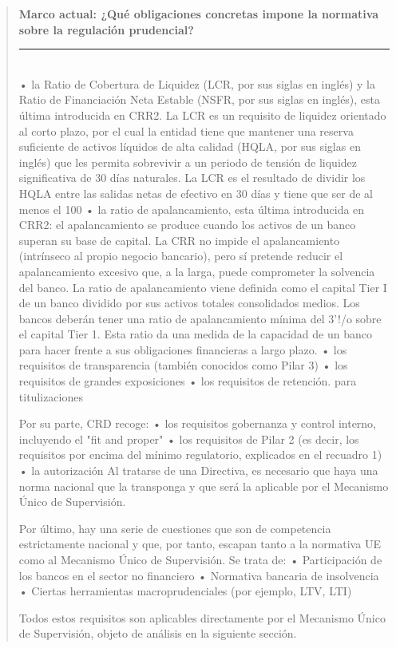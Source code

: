 \documentclass[10pt,a4paper]{article}
\newenvironment{specialblock}[1]{%
      \begin{quote} %
      \small %
      \noindent\textbf{#1}\\[-0.3em] %
      \rule{\linewidth}{0.4pt}\\[0.6em]}{
      \end{quote}}
\begin{document}
\begin{specialblock}{Marco actual: ¿Qué obligaciones concretas impone la normativa sobre la regulación prudencial?}
    • la Ratio de Cobertura de Liquidez (LCR, por sus siglas en inglés) y la Ratio de Financiación Neta Estable (NSFR, por sus siglas en inglés), esta última introducida en CRR2. La LCR es un requisito de liquidez orientado al corto plazo, por el cual la entidad tiene que mantener una reserva suficiente de activos líquidos de alta calidad (HQLA, por sus siglas en inglés) que les permita sobrevivir a un periodo de tensión de liquidez significativa de 30 días naturales. La LCR es el resultado de dividir los HQLA entre las salidas netas de efectivo en 30 días y tiene que ser de al menos el 100%
    • la ratio de apalancamiento, esta última introducida en CRR2: el apalancamiento se produce cuando los activos de un banco superan su base de capital. La CRR no impide el apalancamiento (intrínseco al propio negocio bancario), pero sí pretende reducir el apalancamiento excesivo que, a la larga, puede comprometer la solvencia del banco. La ratio de apalancamiento viene definida como el capital Tier I de un banco dividido por sus activos totales consolidados medios. Los bancos deberán tener una ratio de apalancamiento mínima del 3'!/o sobre el capital Tier 1. Esta ratio da una medida de la capacidad de un banco para hacer frente a sus obligaciones financieras a largo plazo.
    • los requisitos de transparencia (también conocidos como Pilar 3)
    • los requisitos de grandes exposiciones 
    • los requisitos de retención. para titulizaciones

    Por su parte, CRD recoge:
    • los requisitos gobernanza y control interno, incluyendo el "fit and proper"
    • los requisitos de Pilar 2 (es decir, los requisitos por encima del mínimo regulatorio,
    explicados en el recuadro 1)
    • la autorización
    Al tratarse de una Directiva, es necesario que haya una norma nacional que la transponga y que será la aplicable por el Mecanismo Único de Supervisión.
    
    Por último, hay una serie de cuestiones que son de competencia estrictamente nacional y que, por tanto, escapan tanto a la normativa UE como al Mecanismo Único de Supervisión. Se trata de:
    • Participación de los bancos en el sector no financiero
    • Normativa bancaria de insolvencia
    • Ciertas herramientas macroprudenciales (por ejemplo, LTV, LTI)
    
    Todos estos requisitos son aplicables directamente por el Mecanismo Único de Supervisión, objeto de análisis en la siguiente sección.
\end{specialblock}
\end{document}
